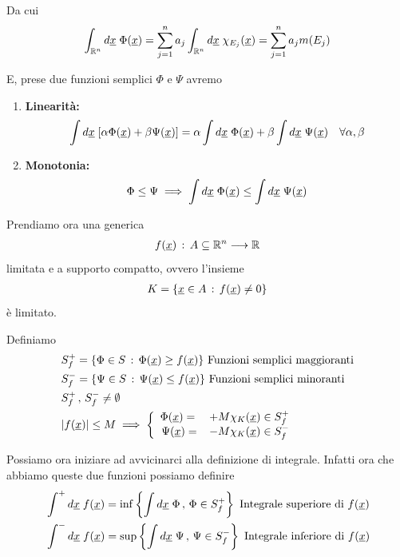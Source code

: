 Da cui
\begin{align}
	\int_{\mathbb{R}^n} d\underline{x}  \;  \Phi(\underline{x})= \sum_{j=1}^{n} a_j \int_{\mathbb{R}^n} d\underline{x}  \; \chi_{E_j}(\underline{x})=  \sum_{j=1}^{n} a_j m(E_j)
\end{align}

E, prese due funzioni semplici $\Phi$ e $\Psi$ avremo
\begin{enumerate}
	\item \textbf{Linearità:}
	\begin{align}
		\int d \underline{x} \; [\alpha \Phi(\underline{x}) + \beta \Psi(\underline{x})] = 	 \alpha \int d \underline{x} \;  \Phi(\underline{x}) + \beta \int d \underline{x} \; \Psi(\underline{x})  \quad \forall \alpha, \beta
	\end{align}
	\item \textbf{Monotonia:}
	\begin{align}
		\Phi \leq \Psi \implies \int d \underline{x} \; \Phi(\underline{x}) \leq \int d \underline{x} \; \Psi(\underline{x})
	\end{align}
\end{enumerate}


Prendiamo ora una generica
\begin{align}
	f(\underline{x}) \, : \, A\subseteq \mathbb{R}^{n} \longrightarrow \mathbb{R}^{}
\end{align}
limitata e a supporto compatto, ovvero l'insieme
\begin{align}
	K= \{ \underline{x} \in A \, : \, f(\underline{x}) \neq 0 \}
\end{align}
è limitato.

Definiamo
\begin{align}
	{}&S_f^+ = \{ \Phi \in S \, : \, \Phi(\underline{x}) \geq f(\underline{x}) \} \text{ Funzioni semplici maggioranti} \\
	&S_f^- = \{ \Psi \in S \, : \, \Psi(\underline{x}) \leq f(\underline{x}) \} \text{ Funzioni semplici minoranti} \\
	& S_f^+ \, , \, S_f^- \neq \emptyset \\
	&|f(\underline{x})|\leq M  \implies \left\{\begin{array}{cc} \Phi(\underline{x}) = {}&+M \chi_K (\underline{x}) \in S_f^+ \\ \Psi(\underline{x}) = &-M \chi_K (\underline{x}) \in S_f^- \end{array}\right.
\end{align}

Possiamo ora iniziare ad avvicinarci alla definizione di integrale. Infatti ora che abbiamo queste due funzioni possiamo definire
\begin{align}
	{}&\int^+ d\underline{x} \; f(\underline{x})= \inf \left\{ \int d \underline{x} \; \Phi \, , \, \Phi \in S_f^+ \right\} \text{ Integrale superiore di  }f(\underline{x})\\
	&\int^- d\underline{x} \; f(\underline{x})= \sup \left\{ \int d \underline{x} \; \Psi \, , \, \Psi \in S_f^- \right\} \text{ Integrale inferiore di  }f(\underline{x})
\end{align}

